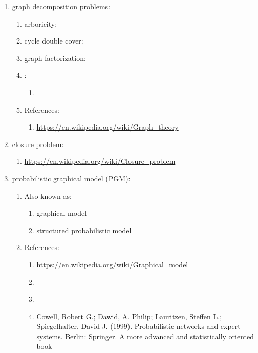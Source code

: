 \begin{enumerate}
\begin{enumerate}
\begin{enumerate}
		\end{enumerate}
	\end{enumerate}
\item graph decomposition problems: \vspace{-0.3cm}
	\begin{enumerate} \itemsep -2pt
	\item arboricity: \url{}
	\item cycle double cover: \url{}
	\item graph factorization: \url{}
	\item : \vspace{-0.2cm}
		\begin{enumerate} \itemsep -2pt
		\item 
		\end{enumerate}
	\item References: \vspace{-0.2cm}
		\begin{enumerate} \itemsep -2pt
		\item \url{https://en.wikipedia.org/wiki/Graph_theory}
		\end{enumerate}
	\end{enumerate}
\item closure problem: \vspace{-0.3cm}
	\begin{enumerate} \itemsep -2pt
	\item \url{https://en.wikipedia.org/wiki/Closure_problem}
	\end{enumerate}
\item probabilistic graphical model (PGM): \vspace{-0.3cm}
	\begin{enumerate} \itemsep -2pt
	\item Also known as: \vspace{-0.2cm}
		\begin{enumerate} \itemsep -2pt
		\item graphical model
		\item structured probabilistic model
		\end{enumerate}
	\item References: \vspace{-0.2cm}
		\begin{enumerate} \itemsep -2pt
		\item \url{https://en.wikipedia.org/wiki/Graphical_model}
		\item \cite{Barber2012}
		\item \cite{Bishop2006}
		\item Cowell, Robert G.; Dawid, A. Philip; Lauritzen, Steffen L.; Spiegelhalter, David J. (1999). Probabilistic networks and expert systems. Berlin: Springer. A more advanced and statistically oriented book

\end{enumerate}
\end{enumerate}
\end{enumerate}
